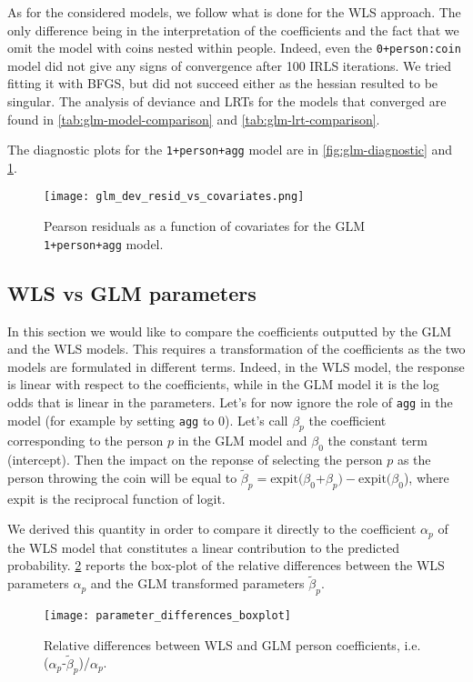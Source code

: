 \documentclass[a4paper, 12pt,oneside]{article}
\begin{document}
			As for the considered models, we follow what is done for the WLS approach. The only difference being in the interpretation of the coefficients and the fact that we omit the model with coins nested within people. Indeed, even the \texttt{0+person:coin} model did not give any signs of convergence after 100 IRLS iterations. We tried fitting it with BFGS, but did not succeed either as the hessian resulted to be singular. The analysis of deviance and LRTs for the models that converged are found in \ref{tab:glm-model-comparison} and \ref{tab:glm-lrt-comparison}.

			The diagnostic plots for the \texttt{1+person+agg} model are in \ref{fig:glm-diagnostic} and \ref{fig:dev-resid-vs-covariates}. 
			\begin{figure}[htb]
				\vspace{-1em}
				\centering
				\texttt{[image: glm\_dev\_resid\_vs\_covariates.png]}
				\caption{Pearson residuals as a function of covariates for the GLM \texttt{1+person+agg} model.}
				\label{fig:dev-resid-vs-covariates}
			\end{figure}	
		\subsection{WLS vs GLM parameters}
			In this section we would like to compare the coefficients outputted by the GLM and the WLS models. This requires a transformation of the coefficients as the two models are formulated in different terms. Indeed, in the WLS model, the response is linear with respect to the coefficients, while in the GLM model it is the log odds that is linear in the parameters. Let's for now ignore the role of \texttt{agg} in the model (for example by setting \texttt{agg} to 0). Let's call $\beta_{p}$ the coefficient corresponding to the person $p$ in the GLM model and $\beta_{0}$ the constant term (intercept). Then the impact on the reponse of selecting the person $p$ as the person throwing the coin will be equal to $\tilde{\beta}_{p}=\text{expit}(\beta_{0}$+$\beta_{p})-\text{expit}(\beta_{0}$), where expit is the reciprocal function of logit. 
			
			We derived this quantity in order to compare it directly to the coefficient $\alpha_{p}$ of the WLS model that constitutes a linear contribution to the predicted probability. \ref{fig:parameter_differences_boxplot} reports the box-plot of the relative differences between the WLS parameters $\alpha_{p}$ and the GLM transformed parameters $\tilde{\beta}_{p}$. 
			\begin{figure}[htb]
				\centering
				\texttt{[image: parameter\_differences\_boxplot]}
				\caption{Relative differences between WLS and GLM person coefficients, i.e. ($\alpha_{p}$-$\tilde{\beta}_{p}$)/$\alpha_{p}$.}
				\label{fig:parameter_differences_boxplot}
			\end{figure}
\end{document}
